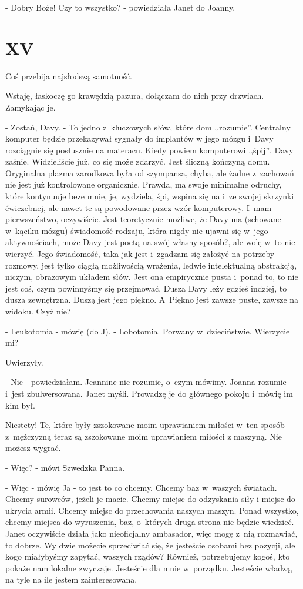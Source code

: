 \documentclass[oneside,polish,12pt,sfheadings]{mwbk}
\begin{document}
- Dobry Boże! Czy to wszystko? - powiedziała Janet do Joanny.

\chapter{XV}

Coś przebija najsłodszą samotność.

Wstaję, łaskoczę go krawędzią pazura, dołączam do nich przy drzwiach.
Zamykając je. 

- Zostań, Davy. - To jedno z~kluczowych słów, które dom
,,rozumie''. Centralny komputer będzie przekazywał sygnały do implantów
w jego mózgu i~Davy rozciągnie się posłusznie na materacu. Kiedy powiem
komputerowi ,,śpij'', Davy zaśnie. Widzieliście już, co się może zdarzyć.
Jest śliczną kończyną domu. Oryginalna plazma zarodkowa była od szympansa,
chyba, ale żadne z~zachowań nie jest już kontrolowane organicznie.
Prawda, ma swoje minimalne odruchy, które kontynuuje beze mnie, je,
wydziela, śpi, wspina się na i~ze swojej skrzynki ćwiczebnej, ale
nawet te są powodowane przez wzór komputerowy. I~mam pierwszeństwo,
oczywiście. Jest teoretycznie możliwe, że Davy ma (schowane w~kąciku
mózgu) świadomość rodzaju, która nigdy nie ujawni się w~jego aktywnościach,
może Davy jest poetą na swój własny sposób?, ale wolę w~to nie wierzyć.
Jego świadomość, taka jak jest i~zgadzam się założyć na potrzeby rozmowy,
jest tylko ciągłą możliwością wrażenia, ledwie intelektualną abstrakcją,
niczym, obrazowym układem słów. Jest ona empirycznie pusta i~ponad
to, to nie jest coś, czym powinnyśmy się przejmować. Dusza Davy leży
gdzieś indziej, to dusza zewnętrzna. Duszą jest jego piękno. A~Piękno
jest zawsze puste, zawsze na widoku. Czyż nie?

- Leukotomia - mówię (do J). - Lobotomia. Porwany w~dzieciństwie. Wierzycie
mi?

Uwierzyły.

- Nie - powiedziałam. Jeannine nie rozumie, o~czym mówimy. Joanna
rozumie i~jest zbulwersowana. Janet myśli. Prowadzę je do głównego
pokoju i~mówię im kim był.

Niestety! Te, które były zszokowane moim uprawianiem miłości w~ten
sposób z~mężczyzną teraz są zszokowane moim uprawianiem miłości z
maszyną. Nie możesz wygrać.

- Więc? - mówi Szwedzka Panna.

- Więc - mówię Ja - to jest to co chcemy. Chcemy baz w~waszych światach.
Chcemy surowców, jeżeli je macie. Chcemy miejsc do odzyskania siły
i miejsc do ukrycia armii. Chcemy miejsc do przechowania naszych maszyn.
Ponad wszystko, chcemy miejsca do wyruszenia, baz, o~których druga
strona nie będzie wiedzieć. Janet oczywiście działa jako nieoficjalny
ambasador, więc mogę z~nią rozmawiać, to dobrze. Wy dwie możecie sprzeciwiać
się, że jesteście osobami bez pozycji, ale kogo miałybyśmy zapytać,
waszych rządów? Również, potrzebujemy kogoś, kto pokaże nam lokalne
zwyczaje. Jesteście dla mnie w~porządku. Jesteście władzą, na tyle
na ile jestem zainteresowana.
\end{document}
